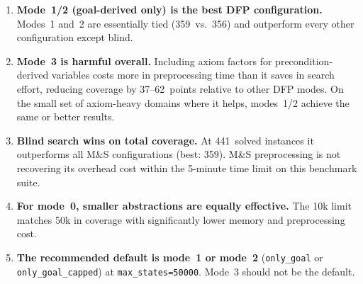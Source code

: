\documentclass[11pt,a4paper]{article}
\begin{document}
\begin{enumerate}
  \item \textbf{Mode~1/2 (goal-derived only) is the best DFP configuration.}
        Modes~1 and~2 are essentially tied (359~vs.\ 356) and outperform
        every other configuration except blind.

  \item \textbf{Mode~3 is harmful overall.}  Including axiom factors for
        precondition-derived variables costs more in preprocessing time than
        it saves in search effort, reducing coverage by 37--62~points
        relative to other DFP modes.  On the small set of axiom-heavy domains
        where it helps, modes~1/2 achieve the same or better results.

  \item \textbf{Blind search wins on total coverage.}  At 441~solved instances
        it outperforms all M\&S configurations (best: 359).  M\&S preprocessing
        is not recovering its overhead cost within the 5-minute time limit on
        this benchmark suite.

  \item \textbf{For mode~0, smaller abstractions are equally effective.}
        The 10k limit matches 50k in coverage with significantly lower memory
        and preprocessing cost.

  \item \textbf{The recommended default is mode~1 or mode~2} (\texttt{only\_goal}
        or \texttt{only\_goal\_capped}) at \texttt{max\_states=50000}.
        Mode~3 should not be the default.
\end{enumerate}
\end{document}
